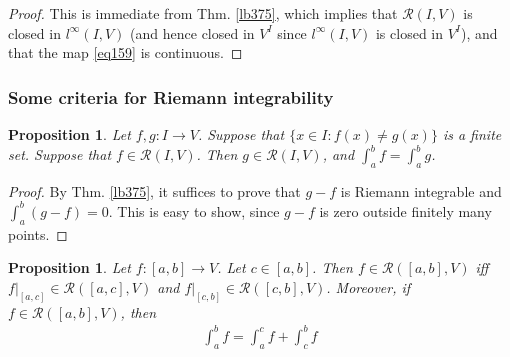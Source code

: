 \documentclass[12pt,b5paper,notitlepage]{article}
\theoremstyle{definition}
\theoremstyle{plain}
\newtheorem{pp}[df]{Proposition}
\newcommand{\scr}{\mathscr}
\newcommand{\dps}{\displaystyle}
\numberwithin{equation}{section}
\begin{document}
\begin{proof}
This is immediate from Thm. \ref{lb375}, which implies that $\scr R(I,V)$ is closed in $l^\infty(I,V)$ (and hence closed in $V^I$ since $l^\infty(I,V)$ is closed in $V^I$), and that the map \eqref{eq159} is continuous.
\end{proof}



\subsubsection{Some criteria for Riemann integrability}



\begin{pp}\label{lb382}
Let $f,g:I\rightarrow V$. Suppose that $\{x\in I:f(x)\neq g(x)\}$ is a finite set. Suppose that $f\in\scr R(I,V)$. Then $g\in\scr R(I,V)$, and $\dps\int_a^bf=\int_a^b g$.
\end{pp}

\begin{proof}
By Thm. \ref{lb375}, it suffices to prove that $g-f$ is Riemann integrable and $\int_a^b(g-f)=0$. This is easy to show, since $g-f$ is zero outside finitely many points. 
\end{proof}





\begin{pp}\label{lb376}
Let $f:[a,b]\rightarrow V$. Let $c\in[a,b]$. Then $f\in\scr R([a,b],V)$ iff $f|_{[a,c]}\in\scr R([a,c],V)$ and $f|_{[c,b]}\in\scr R([c,b],V)$. Moreover, if $f\in\scr R([a,b],V)$, then
\begin{align}
\int_a^b f=\int_a^cf+\int_c^bf\label{eq158}
\end{align}
\end{pp}
\end{document}
